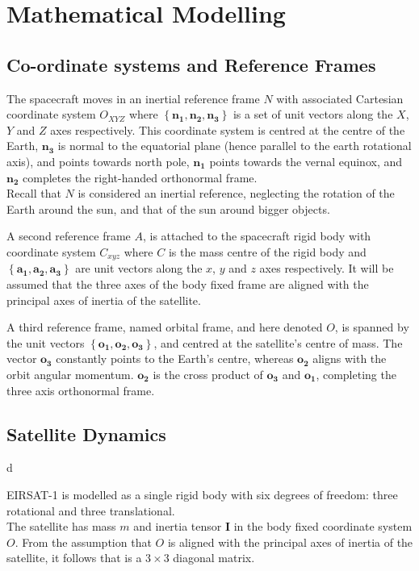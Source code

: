 
\section{Mathematical Modelling}
\subsection{Co-ordinate systems and Reference Frames}

The spacecraft moves in an inertial reference frame $N$ with associated Cartesian coordinate system $O_{XYZ}$ where $\left\{ \mathbf{n_1}, \mathbf{n_2}, \mathbf{n_3} \right\}$ is a set of unit vectors along the $X$, $Y$ and $Z$ axes respectively. This coordinate system is centred at the centre of the Earth, $\mathbf{n_3}$ is normal to the equatorial plane (hence parallel to the earth rotational axis), and points towards north pole, $\mathbf{n_1}$ points towards the vernal equinox, and $\mathbf{n_2}$ completes the right-handed orthonormal frame.\\
Recall that $N$ is considered an inertial reference, neglecting the rotation of the Earth around the sun, and that of the sun around bigger objects.

A second reference frame $A$, is attached to the spacecraft rigid body with coordinate system $C_{xyz}$ where $C$ is the mass centre of the rigid body and $ \left\{\mathbf{a_1}, \mathbf{a_2}, \mathbf{a_3} \right\}$ are unit vectors along the $x$, $y$ and $z$ axes respectively. It will be assumed that the three axes of the body fixed frame are aligned with the principal axes of inertia of the satellite. 

A third reference frame, named orbital frame, and here denoted $O$, is spanned by the unit vectors $\left\{\mathbf{o_1}, \mathbf{o_2}, \mathbf{o_3} \right\}$, and centred at the satellite's centre of mass. The vector $\mathbf{o_3}$ constantly points to the Earth's centre, whereas $\mathbf{o_2}$ aligns with the orbit angular momentum. $\mathbf{o_2}$ is the cross product of $\mathbf{o_3}$ and $\mathbf{o_1}$, completing the three axis orthonormal frame.

\subsection{Satellite Dynamics}d

EIRSAT-1 is modelled as a single rigid body with six degrees of freedom: three rotational and three translational.\\
The satellite has mass $m$ and inertia tensor $\mathbf{I}$ in the body fixed coordinate system $O$. From the assumption that $O$ is aligned with the principal axes of inertia of the satellite, it follows that is a $3\times 3$ diagonal matrix.

